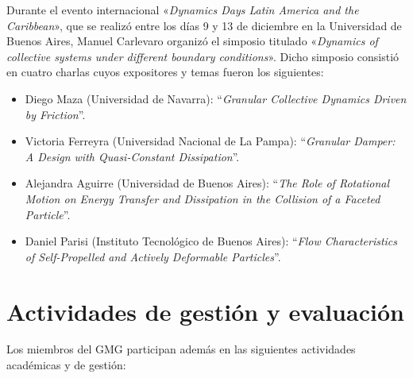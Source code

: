 \documentclass[a4paper,11pt,twoside,final,titlepage,onecolumn,openright]{report}
\begin{document}
Durante el evento internacional «\textit{Dynamics Days Latin America and the Caribbean}», que se realizó entre los días 9 y 13 de diciembre en la Universidad de Buenos Aires, Manuel Carlevaro organizó el simposio titulado «\textit{Dynamics of collective systems under different boundary conditions}». Dicho simposio consistió en cuatro charlas cuyos expositores y temas fueron los siguientes:
\begin{itemize}
  \item Diego Maza (Universidad de Navarra): ``\textit{Granular Collective Dynamics Driven by Friction}''.
  \item Victoria Ferreyra (Universidad Nacional de La Pampa): ``\textit{Granular Damper: A Design with Quasi-Constant Dissipation}''.
  \item Alejandra Aguirre (Universidad de Buenos Aires): ``\textit{The Role of Rotational Motion on Energy Transfer and Dissipation in the Collision of a Faceted Particle}''.
  \item Daniel Parisi (Instituto Tecnológico de Buenos Aires): ``\textit{Flow Characteristics of Self-Propelled and Actively Deformable Particles}''.
\end{itemize}


\section{Actividades de gestión y evaluación}

Los miembros del GMG participan además en las siguientes actividades académicas y de gestión:
\end{document}
